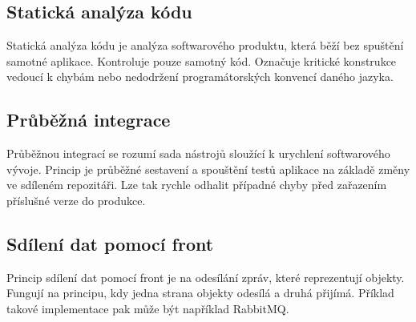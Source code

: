 \documentclass[thesis=B,czech]{FITthesis}[2012/06/26]
\begin{document}
\subsection{Statická analýza kódu}
Statická analýza kódu je analýza softwarového produktu, která běží bez spuštění samotné aplikace. Kontroluje 
pouze samotný kód. Označuje kritické konstrukce vedoucí k chybám nebo nedodržení programátorských konvencí daného
jazyka.
\subsection{Průběžná integrace}
Průběžnou integrací se rozumí sada nástrojů sloužící k urychlení softwarového vývoje. Princip je průběžné sestavení
a spouštění testů aplikace na základě změny ve sdíleném repozitáři. Lze tak rychle odhalit případné chyby před zařazením 
příslušné verze do produkce.\cite{CI}

\subsection{Sdílení dat pomocí front}
Princip sdílení dat pomocí front je na odesílání zpráv, které reprezentují objekty. Fungují na principu, kdy jedna strana objekty
odesílá a druhá přijímá. Příklad takové implementace pak může být například RabbitMQ. \cite{rabbitMQ}
\end{document}
